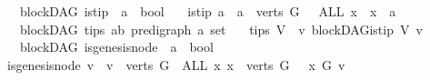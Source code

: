 \begin{isabellebody}
\isamarkupfalse%
\ {\isacharparenleft}{\kern0pt}\ blockDAG{\isacharparenright}{\kern0pt}\ is{\isacharunderscore}{\kern0pt}tip{\isacharcolon}{\kern0pt}{\isacharcolon}{\kern0pt}\ {\isachardoublequoteopen}\ {\isacharprime}{\kern0pt}a\ {\isasymRightarrow}\ bool{\isachardoublequoteclose}\isanewline
\ \ \ {\isachardoublequoteopen}is{\isacharunderscore}{\kern0pt}tip\ a\ {\isacharequal}{\kern0pt}\ {\isacharparenleft}{\kern0pt}{\isacharparenleft}{\kern0pt}a\ {\isasymin}\ verts\ G{\isacharparenright}{\kern0pt}\ {\isasymand}\ \ {\isacharparenleft}{\kern0pt}ALL\ x{\isachardot}{\kern0pt}\ {\isasymnot}\ x\ {\isasymrightarrow}\isactrlsup {\isacharplus}{\kern0pt}\ a{\isacharparenright}{\kern0pt}{\isacharparenright}{\kern0pt}{\isachardoublequoteclose}\isanewline
\isanewline
{}\isamarkupfalse%
\ {\isacharparenleft}{\kern0pt}\ blockDAG{\isacharparenright}{\kern0pt}\ tips{\isacharcolon}{\kern0pt}{\isacharcolon}{\kern0pt}\ {\isachardoublequoteopen}{\isacharparenleft}{\kern0pt}{\isacharprime}{\kern0pt}a{\isacharcomma}{\kern0pt}{\isacharprime}{\kern0pt}b{\isacharparenright}{\kern0pt}\ pre{\isacharunderscore}{\kern0pt}digraph\ {\isasymRightarrow}{\isacharprime}{\kern0pt}a\ set{\isachardoublequoteclose}\isanewline
\ \ \ {\isachardoublequoteopen}tips\ V\ {\isacharequal}{\kern0pt}\ {\isacharbraceleft}{\kern0pt}v{\isachardot}{\kern0pt}\ blockDAG{\isachardot}{\kern0pt}is{\isacharunderscore}{\kern0pt}tip\ V\ v{\isacharbraceright}{\kern0pt}{\isachardoublequoteclose}\isanewline
\isanewline
{}\isamarkupfalse%
\ {\isacharparenleft}{\kern0pt}\ blockDAG{\isacharparenright}{\kern0pt}\ is{\isacharunderscore}{\kern0pt}genesis{\isacharunderscore}{\kern0pt}node\ {\isacharcolon}{\kern0pt}{\isacharcolon}{\kern0pt}\ {\isachardoublequoteopen}{\isacharprime}{\kern0pt}a\ {\isasymRightarrow}\ bool{\isachardoublequoteclose}\ \isanewline
{\isachardoublequoteopen}is{\isacharunderscore}{\kern0pt}genesis{\isacharunderscore}{\kern0pt}node\ v\ {\isacharequal}{\kern0pt}\ {\isacharparenleft}{\kern0pt}{\isacharparenleft}{\kern0pt}v\ {\isasymin}\ verts\ G{\isacharparenright}{\kern0pt}\ {\isasymand}\ {\isacharparenleft}{\kern0pt}ALL\ x{\isachardot}{\kern0pt}\ {\isacharparenleft}{\kern0pt}x\ {\isasymin}\ verts\ G{\isacharparenright}{\kern0pt}\ {\isasymlongrightarrow}\ \ x\ {\isasymrightarrow}\isactrlsup {\isacharasterisk}{\kern0pt}\isactrlbsub G\isactrlesub \ v{\isacharparenright}{\kern0pt}{\isacharparenright}{\kern0pt}{\isachardoublequoteclose}\isanewline
\isanewline
{}\isamarkupfalse%

\end{isabellebody}
